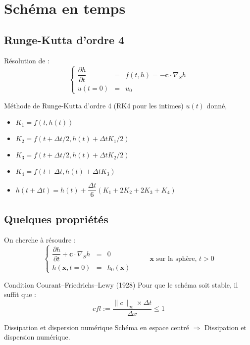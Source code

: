 \documentclass[11pt]{beamer}
\begin{document}
\begin{frame}
\tableofcontents
\end{frame}


\section{Schéma en temps}
\subsection{Runge-Kutta d'ordre 4}
\begin{frame}
\begin{block}{}
Résolution de :
$$\left\{
\begin{array}{rcl}
\dfrac{\partial h}{\partial t} & = & f(t,h) = - \mathbf{c} \cdot \nabla_S h\\
u(t=0) & = & u_0
\end{array}
\right.$$
\end{block}

\pause
\begin{block}{Méthode de Runge-Kutta d'ordre 4 (RK4 pour les intimes)}
$u(t)$ donné, 
\begin{itemize}
\item $K_1 = f(t, h(t))$
\item $K_2 = f(t+\Delta t/2, h(t)+\Delta t K_1 /2)$
\item $K_3 = f(t+\Delta t/2, h(t)+\Delta t K_2 /2)$
\item $K_4 = f(t+\Delta t, h(t)+\Delta t K_3)$
\item $h(t+\Delta t) = h(t)+\dfrac{\Delta t}{6}\left( K_1 + 2 K_2 + 2 K_3 + K_4\right)$
\end{itemize}
\end{block}
\end{frame}

\subsection{Quelques propriétés}
\begin{frame}
On cherche à résoudre :
$$\left\{
\begin{array}{rcl}
\dfrac{\partial h}{\partial t} + \mathbf{c} \cdot \nabla_S h & = & 0 \\
h(\mathbf{x},t=0) & = & h_0 ( \mathbf{x} )
\end{array}
\right. \hspace{1cm} \mathbf{x} \text{ sur la sphère, } t>0$$

\pause
\begin{block}{Condition Courant–Friedrichs–Lewy (1928)}
Pour que le schéma soit stable, il suffit que :
$$cfl := \dfrac{\|c\|_{\infty} \times \Delta t}{\Delta x} \leq 1$$
\end{block}

\pause
\begin{block}{Dissipation et dispersion numérique}
Schéma en espace centré $\Rightarrow$ Dissipation et dispersion numérique.
\end{block}
\end{frame}
\end{document}
